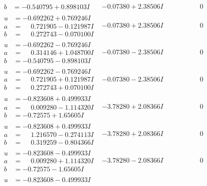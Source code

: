 \documentclass[1p]{elsarticle_modified}
\theoremstyle{definition}
\begin{document}
$$\begin{array}{c|c|c}
\begin{aligned}
b &= -0.540795 + 0.898103 I\end{aligned}
 & -0.07380 + 2.38506 I & \phantom{-0.000000 } 0 \\ \hline\begin{aligned}
u &= -0.692262 + 0.769246 I \\
a &= \phantom{-}0.721905 - 0.121987 I \\
b &= \phantom{-}0.272743 - 0.070100 I\end{aligned}
 & -0.07380 + 2.38506 I & \phantom{-0.000000 } 0 \\ \hline\begin{aligned}
u &= -0.692262 - 0.769246 I \\
a &= \phantom{-}0.314146 + 1.048700 I \\
b &= -0.540795 - 0.898103 I\end{aligned}
 & -0.07380 - 2.38506 I & \phantom{-0.000000 } 0 \\ \hline\begin{aligned}
u &= -0.692262 - 0.769246 I \\
a &= \phantom{-}0.721905 + 0.121987 I \\
b &= \phantom{-}0.272743 + 0.070100 I\end{aligned}
 & -0.07380 - 2.38506 I & \phantom{-0.000000 } 0 \\ \hline\begin{aligned}
u &= -0.823608 + 0.499933 I \\
a &= \phantom{-}0.009280 - 1.114320 I \\
b &= -0.72575 + 1.65605 I\end{aligned}
 & -3.78280 + 2.08366 I & \phantom{-0.000000 } 0 \\ \hline\begin{aligned}
u &= -0.823608 + 0.499933 I \\
a &= \phantom{-}1.216570 - 0.274113 I \\
b &= \phantom{-}0.319259 - 0.804366 I\end{aligned}
 & -3.78280 + 2.08366 I & \phantom{-0.000000 } 0 \\ \hline\begin{aligned}
u &= -0.823608 - 0.499933 I \\
a &= \phantom{-}0.009280 + 1.114320 I \\
b &= -0.72575 - 1.65605 I\end{aligned}
 & -3.78280 - 2.08366 I & \phantom{-0.000000 } 0 \\ \hline\begin{aligned}
u &= -0.823608 - 0.499933 I \\

\end{aligned}
\end{array}$$
\end{document}
